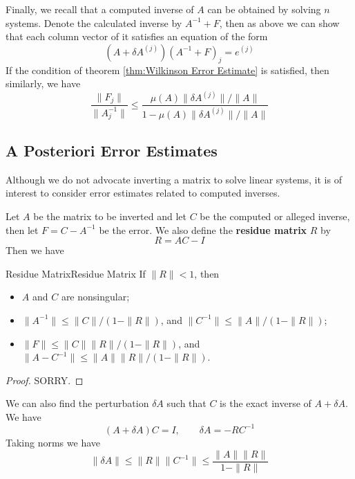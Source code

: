 \documentclass[../main.tex]{subfiles}
\begin{document}
Finally, we recall that a computed inverse of $A$ can be obtained by solving $n$ systems. Denote the calculated inverse by $A^{-1} + F$, then as above we can show that each column vector of it satisfies an equation of the form
\begin{equation*}
	(A + \delta A ^{(j)})(A^{-1} + F)_j = e^{(j)}
\end{equation*}
If the condition of theorem \ref{thm:Wilkinson Error Estimate} is satisfied, then similarly, we have
\begin{equation}\label{eq:error-for-inverse}
	\frac{\| F_j \|}{\| A_j^{-1} \|} \leq \frac{\mu(A) \| \delta A^{(j)} \| / \| A \|}{1 - \mu(A) \| \delta A^{(j)} \| / \| A \|}
\end{equation}

\subsection{A Posteriori Error Estimates}
Although we do not advocate inverting a matrix to solve linear systems, it is of interest to consider error estimates related to computed inverses.

Let $A$ be the matrix to be inverted and let $C$ be the computed or alleged inverse, then let $F = C - A^{-1}$ be the error. We also define the \textbf{residue matrix} $R$ by
\begin{equation}
	R = A C - I
\end{equation}
Then we have

\begin{theorem}{Residue Matrix}{Residue Matrix}
	If $\| R \| < 1 $, then
	\begin{itemize}
		\item $A$ and $C$ are nonsingular;
		\item $\| A^{-1} \| \leq \| C \| / (1 - \| R \|)$, and $\| C^{-1} \| \leq \| A \| / (1 - \| R \|)$;
		\item $\| F \| \leq \| C \| \| R \| / (1 - \| R \|)$, and $\| A - C^{-1} \| \leq \| A \| \| R \| / (1 - \| R \|)$.
	\end{itemize}
\end{theorem}
\begin{proof}
	SORRY.
\end{proof}

We can also find the perturbation $\delta A$ such that $C$ is the exact inverse of $A + \delta A$. We have
\begin{equation*}
	(A + \delta A) C = I, \qquad \delta A = - R C^{-1}
\end{equation*}
Taking norms we have
\begin{equation*}
	\| \delta A \| \leq \| R \| \| C^{-1} \| \leq \frac{\| A \| \| R \|}{1 - \| R \|}
\end{equation*}
\end{document}
